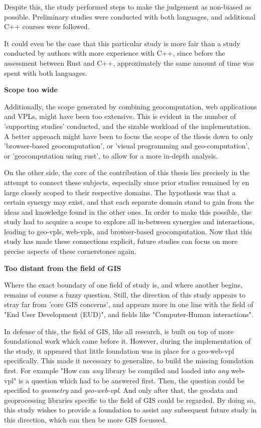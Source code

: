 Despite this, the study performed steps to make the judgement as non-biased as possible.
Preliminary studies were conducted with both languages, and additional C++ courses were followed. 

It could even be the case that this particular study is more fair than a study conducted by authors with more experience with C++, 
since before the assessment between Rust and C++, approximately the same amount of time was spent with both languages. 

\textbf{Scope too wide}

Additionally, the scope generated by combining geocomputation, web applications and VPLs, might have been too extensive. 
This is evident in the number of 'supporting studies' conducted, and the sizable workload of the implementation.
A better approach might have been to focus the scope of the thesis down to only 'browser-based geocomputation', or 'visual programming and geo-computation', or 'geocomputation using rust', to allow for a more in-depth analysis.

On the other side, the core of the contribution of this thesis lies precisely in the attempt to connect these subjects,
especially since prior studies remained by en large closely scoped to their respective domains.
The hypothesis was that a certain synergy may exist, and that each separate domain stand to gain from the ideas and knowledge found in the other ones. 
In order to make this possible, the study had to acquire a scope to explore all in-between synergies and interactions, leading to geo-vpls, web-vpls, and browser-based geocomputation. 
Now that this study has made these connections explicit, future studies can focus on more precise aspects of these cornerstones again.

\textbf{Too distant from the field of GIS}

Where the exact boundary of one field of study is, and where another begins, remains of course a fuzzy question. 
Still, the direction of this study appears to stray far from 'core GIS concerns', and appears more in one line with the  field of "End User Development (EUD)", and fields like "Computer-Human interactions". 

In defense of this, the field of GIS, like all research, is built on top of more foundational work which came before it. 
However, during the implementation of the study, it appeared that little foundation was in place for a geo-web-vpl specifically. 
This made it necessary to generalize, to build the missing foundation first.
For example "How can \emph{any} library be compiled and loaded into \emph{any} web-vpl" is a question which had to be answered first. 
Then, the question could be specified to \emph{geometry} and \emph{geo-web-vpl}. 
And only after that, the geodata and geoprocessing libraries specific to the field of GIS could be regarded. 
By doing so, this study wishes to provide a foundation to assist any subsequent future study in this direction, which can then be more GIS focussed.

